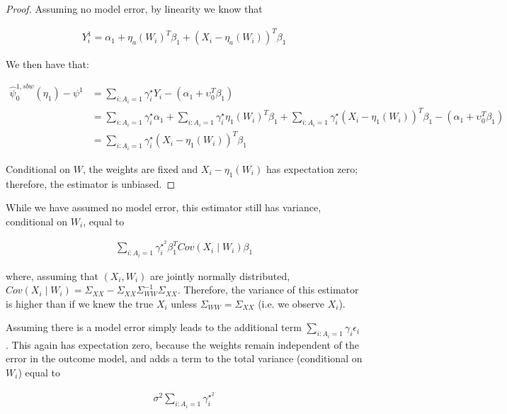 \begin{proof}

Assuming no model error, by linearity we know that

\begin{align*}
Y_i^1 = \alpha_1 + \eta_a(W_i)^T\beta_1 + (X_i - \eta_a(W_i))^T\beta_1
\end{align*}

We then have that:

\begin{align*}
    \hat{\psi}^{1, sbw}_0(\eta_1) - \psi^1 &= \sum_{i: A_i = 1}\gamma_i^\star Y_i - (\alpha_1 + \upsilon_0^T\beta_1) \\
    &= \sum_{i: A_i = 1}\gamma_i^\star\alpha_1 + \sum_{i: A_i = 1}\gamma_i^\star\eta_1(W_i)^T\beta_1 + \sum_{i: A_i = 1}\gamma_i^\star(X_i - \eta_1(W_i))^T\beta_1 - (\alpha_1 + \upsilon_0^T\beta_1) \\
    &= \sum_{i: A_i = 1}\gamma_i^\star(X_i - \eta_1(W_i))^T\beta_1
\end{align*}

Conditional on $W$, the weights are fixed and $X_i - \eta_1(W_i)$ has expectation zero; therefore, the estimator is unbiased.
\end{proof}
\begin{remark}

While we have assumed no model error, this estimator still has variance, conditional on $W_i$, equal to

\begin{align*}
\sum_{i: A_i = 1} \gamma_i^{\star^2}\beta_1^T Cov(X_i \mid W_i)\beta_1
\end{align*}

where, assuming that $(X_i, W_i)$ are jointly normally distributed, $Cov(X_i \mid W_i) = \Sigma_{XX} - \Sigma_{XX}\Sigma_{WW}^{-1}\Sigma_{XX}$. Therefore, the variance of this estimator is higher than if we knew the true $X_i$ unless $\Sigma_{WW} = \Sigma_{XX}$ (i.e. we observe $X_i$). 
\end{remark}

\begin{remark}
Assuming there is a model error simply leads to the additional term $\sum_{i: A_i = 1}\gamma_i\epsilon_i$. This again has expectation zero, because the weights remain independent of the error in the outcome model, and adds a term to the total variance (conditional on $W_i$) equal to

\begin{align*}
\sigma^2\sum_{i: A_i = 1}\gamma_i^{\star^2}
\end{align*}
\end{remark}

